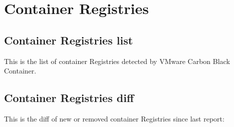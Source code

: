 \section{Container Registries}
\subsection{Container Registries list}
This is the list of container Registries detected by VMware Carbon Black Container.
\vskip15pt


\vskip15pt

\subsection{Container Registries diff}
This is the diff of new or removed container Registries since last report:
\vskip10pt







